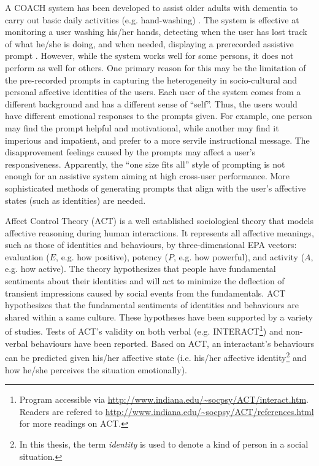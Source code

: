 A COACH system has been developed to assist older adults with dementia to carry out basic daily activities (e.g. hand-washing) \cite{boger2005decision, mihailidis2008coach}. The system is effective at monitoring a user washing his/her hands, detecting when the user has lost track of what he/she is doing, and when needed, displaying a prerecorded assistive prompt \cite{mihailidis2008coach}. However, while the system works well for some persons, it does not perform as well for others. One primary reason for this may be the limitation of the pre-recorded prompts in capturing the heterogeneity in socio-cultural and personal affective identities of the users. Each user of the system comes from a different background and has a different sense of ``self''. Thus, the users would have different emotional responses to the prompts given. For example, one person may find the prompt helpful and motivational, while another may find it imperious and impatient, and prefer to a more servile instructional message. The disapprovement feelings caused by the prompts may affect a user's responsiveness. Apparently, the ``one size fits all'' style of prompting is not enough for an assistive system aiming at high cross-user performance. More sophisticated methods of generating prompts that align with the user's affective states (such as identities) are needed.

Affect Control Theory (ACT) \cite{robinson2006affect} is a well established sociological theory that models affective reasoning during human interactions. It represents all affective meanings, such as those of identities and behaviours, by three-dimensional EPA vectors: evaluation ($E$, e.g. how positive), potency ($P$, e.g. how powerful), and activity ($A$, e.g. how active). The theory hypothesizes that people have fundamental sentiments about their identities and will act to minimize the deflection of transient impressions caused by social events from the fundamentals. ACT hypothesizes that the fundamental sentiments of identities and behaviours are shared within a same culture. These hypotheses have been supported by a variety of studies. Tests of ACT's validity on both verbal (e.g. INTERACT\footnote{Program accessible via \url{http://www.indiana.edu/~socpsy/ACT/interact.htm}. Readers are refered to \url{http://www.indiana.edu/~socpsy/ACT/references.html} for more readings on ACT.}) and non-verbal behaviours \cite{schroder2013culture} have been reported. Based on ACT, an interactant's behaviours can be predicted given his/her affective state (i.e. his/her affective identity\footnote{In this thesis, the term \textit{identity} is used to denote a kind of person in a social situation.} and how he/she perceives the situation emotionally).

